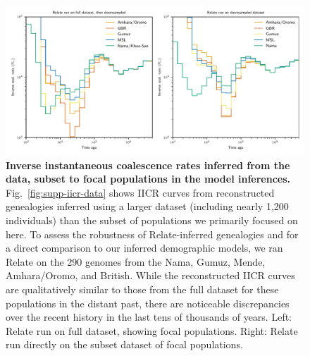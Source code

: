 \documentclass[]{article}
\begin{document}
\begin{figure}[ht]
    \centering
    \includegraphics[width=\textwidth]{figures/supp-relate-iicr-data-full-and-subset}
    \caption{
        \textbf{Inverse instantaneous coalescence rates inferred from the data,
        subset to focal populations in the model inferences.}
        Fig.~\ref{fig:supp-iicr-data} shows IICR curves from reconstructed
        genealogies inferred using a larger dataset (including nearly 1,200
        individuals) than the subset of populations we primarily focused on
        here. To assess the robustness of Relate-inferred genealogies and for a
        direct comparison to our inferred demographic models, we ran Relate on
        the 290 genomes from the Nama, Gumuz, Mende, Amhara/Oromo, and British.
        While the reconstructed IICR curves are qualitatively similar to those
        from the full dataset for these populations in the distant past, there
        are noticeable discrepancies over the recent history in the last tens of
        thousands of years. Left: Relate run on full dataset, showing focal
        populations. Right: Relate run directly on the subset dataset of focal
        populations.
    }
    \label{fig:supp-iicr-data-subset}
\end{figure}
\end{document}
